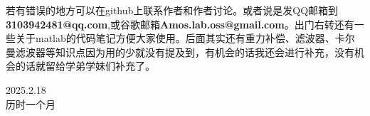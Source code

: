\documentclass[UTF8,a4paper,12pt]{ctexart}
\begin{document}
            \begin{flushleft}
              若有错误的地方可以在github上联系作者和作者讨论。或者说是发QQ邮箱到\textbf{3103942481@qq.com},或谷歌邮箱\textbf{Amos.lab.oss@gmail.com}。出门右转还有一些关于matlab的代码笔记方便大家使用。后面其实还有重力补偿、滤波器、卡尔曼滤波器等知识点因为用的少就没有提及到，有机会的话我还会进行补充，没有机会的话就留给学弟学妹们补充了。
            \end{flushleft}
        \begin{flushright}
          2025.2.18\\
          历时一个月
        \end{flushright}
\end{document}
